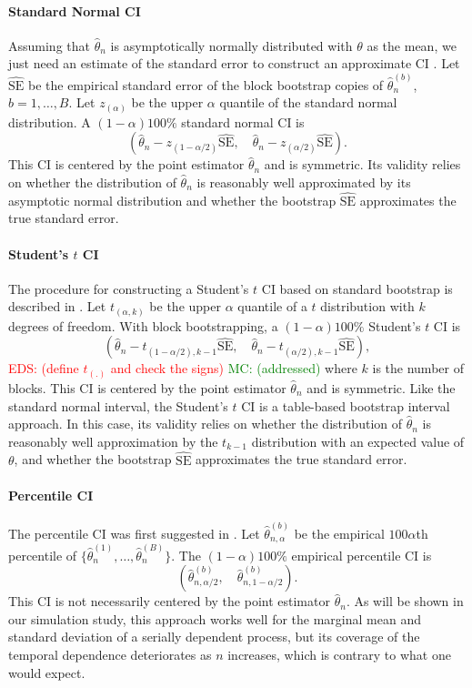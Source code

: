 \documentclass[12pt, letterpaper, titlepage]{article}
\newcommand{\eds}[1]{\textcolor{red}{EDS: (#1)}}
\newcommand{\mc}[1]{\textcolor{green}{MC: (#1)}}
\begin{document}
\paragraph{Standard Normal CI}
Assuming that $\hat\theta_n$ is asymptotically normally distributed with
$\theta$ as the mean, we just need an estimate of the standard error to
construct an approximate CI \citep[p.168]{efron1993introduction}.
Let $\widehat{\text{SE}}$ be the empirical standard error of the block bootstrap
copies of $\hat\theta_n^{(b)}$, $b = 1, \ldots, B$. Let $z_{(\alpha)}$ be the
upper $\alpha$ quantile of the standard normal distribution.
A $(1 - \alpha)100\%$ standard normal CI is
\[
(\hat{\theta}_{n} - z_{(1-\alpha/2)}\widehat{\text{SE}}, \quad
\hat{\theta}_{n} - z_{(\alpha/2)}\widehat{\text{SE}}).
\]
This CI is centered by the point estimator $\hat\theta_n$ and is symmetric.
Its validity relies on whether the distribution of $\hat\theta_n$ is reasonably
well approximated by its asymptotic normal distribution and whether the
bootstrap $\widehat{\text{SE}}$ approximates the true standard error.


\paragraph{Student's $t$ CI}
The procedure for constructing a Student's $t$ CI based on standard bootstrap
is described in \citet[p.158]{efron1993introduction}. Let $t_{(\alpha, k)}$ be the
upper $\alpha$ quantile of a $t$ distribution with $k$ degrees of freedom.
With block bootstrapping, a $(1 - \alpha)100\%$ Student's $t$ CI is
\[
(\hat{\theta}_{n} - t_{(1-\alpha/2), k - 1}\hat{\text{SE}}, \quad
\hat{\theta}_{n} - t_{(\alpha/2), k -1}\hat{\text{SE}}),
\]
\eds{define $t_{(.)}$ and check the signs}  \mc{addressed}
where $k$ is the number of blocks.
This CI is centered by the point estimator $\hat\theta_n$ and is symmetric.
Like the standard 
normal interval, the Student's $t$ CI is a table-based bootstrap interval
approach. In this case,
its validity relies on whether the distribution of $\hat\theta_n$ is
reasonably well approximation by the $t_{k-1}$ distribution with an
expected value of $\theta$, and whether the bootstrap 
$\widehat{\text{SE}}$ approximates the true standard error.


\paragraph{Percentile CI}
The percentile CI was first suggested in \citet{efron1979bootstrap}.
Let $\hat\theta_{n, \alpha}^{(b)}$ be the empirical $100\alpha$th percentile of
$\{\hat\theta_n^{(1)}, \ldots, \hat\theta_n^{(B)}\}$. The $(1 - \alpha)100\%$
empirical percentile CI is
\[
(\hat\theta_{n, \alpha/2}^{(b)}, \quad \hat\theta_{n, 1 - \alpha/2}^{(b)}).
\]
This CI is not necessarily centered by the point estimator $\hat\theta_n$.
As will be shown in our simulation study, this approach works well for the
marginal mean and standard deviation of a serially dependent process, but its
coverage of the temporal dependence deteriorates as $n$ increases, which is
contrary to what one would expect.
\end{document}
